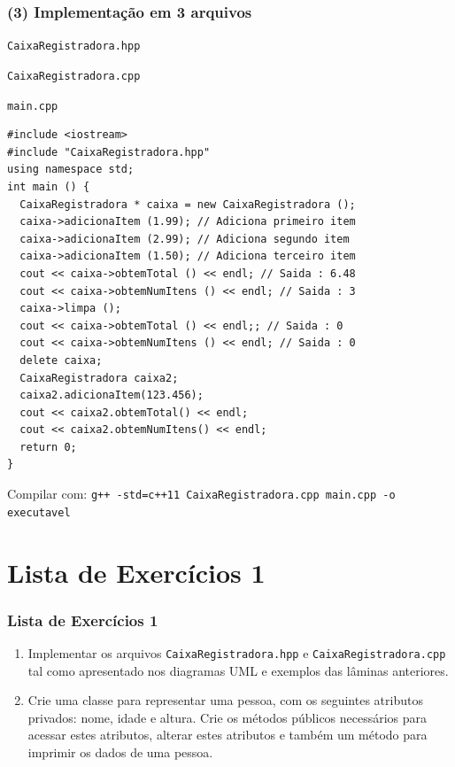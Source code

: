 \documentclass[aspectratio=169]{beamer}
\begin{document}
\begin{frame}[fragile]\frametitle{(3) Implementação em 3 arquivos}
\begin{enumerate}
{\scriptsize
	\item \texttt{CaixaRegistradora.hpp}
	\item \texttt{CaixaRegistradora.cpp}
	\item \texttt{main.cpp}
\begin{lstlisting}[basicstyle=\ttfamily\tiny]
#include <iostream>
#include "CaixaRegistradora.hpp"
using namespace std;
int main () {
  CaixaRegistradora * caixa = new CaixaRegistradora ();
  caixa->adicionaItem (1.99); // Adiciona primeiro item
  caixa->adicionaItem (2.99); // Adiciona segundo item
  caixa->adicionaItem (1.50); // Adiciona terceiro item
  cout << caixa->obtemTotal () << endl; // Saida : 6.48
  cout << caixa->obtemNumItens () << endl; // Saida : 3
  caixa->limpa ();
  cout << caixa->obtemTotal () << endl;; // Saida : 0
  cout << caixa->obtemNumItens () << endl; // Saida : 0
  delete caixa;
  CaixaRegistradora caixa2;
  caixa2.adicionaItem(123.456);
  cout << caixa2.obtemTotal() << endl;
  cout << caixa2.obtemNumItens() << endl;
  return 0;
}
\end{lstlisting}
Compilar com: \texttt{g++ -std=c++11 CaixaRegistradora.cpp main.cpp -o executavel}
}
\end{enumerate}
\end{frame}

\section{Lista de Exercícios 1}

\begin{frame}\frametitle{Lista de Exercícios 1}
\begin{enumerate}
	\item Implementar os arquivos \texttt{CaixaRegistradora.hpp} e \texttt{CaixaRegistradora.cpp} tal como apresentado nos diagramas UML e exemplos das lâminas anteriores.
	\item Crie uma classe para representar uma pessoa, com os seguintes atributos privados: nome, idade e altura. Crie os métodos públicos necessários para acessar estes atributos, alterar estes atributos e também um método para imprimir os dados de uma pessoa.
\end{enumerate}
\end{frame}
\end{document}
